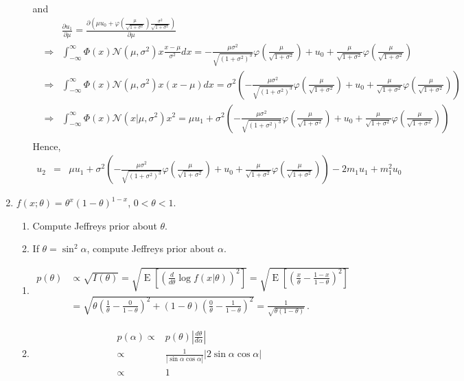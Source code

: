 \documentclass[10pt,a4paper]{article}
\def\MN{{\mathcal N}}
\begin{document}
\begin{enumerate}
\begin{enumerate}
\begin{eqnarray*}
\end{eqnarray*}
and 
\begin{eqnarray*}
&& \frac{\partial u_1}{\partial \mu} = \frac{\partial(\mu u_0+ \varphi(\frac{\mu}{\sqrt{1+\sigma^2}})\frac{\sigma^2}{\sqrt{1+\sigma^2}})}{\partial \mu} \\
&\Longrightarrow &\int_{-\infty}^{\infty}\Phi(x)\MN(\mu,\sigma^2)x\frac{x-\mu}{\sigma^2}dx = -\frac{\mu\sigma^2}{\sqrt{(1+\sigma^2)^{3}}}\varphi(\frac{\mu}{\sqrt{1+\sigma^2}})+u_0+\frac{\mu}{\sqrt{1+\sigma^2}}\varphi(\frac{\mu}{\sqrt{1+\sigma^2}}) \\
&\Longrightarrow &\int_{-\infty}^{\infty}\Phi(x)\MN(\mu,\sigma^2)x(x-\mu)dx = \sigma^2\left(-\frac{\mu\sigma^2}{\sqrt{(1+\sigma^2)^{3}}}\varphi(\frac{\mu}{\sqrt{1+\sigma^2}})+u_0+\frac{\mu}{\sqrt{1+\sigma^2}}\varphi(\frac{\mu}{\sqrt{1+\sigma^2}})\right) \\
&\Longrightarrow &\int_{-\infty}^{\infty} \Phi(x) \MN(x|\mu, \sigma^2)x^2 = \mu u_1+ \sigma^2\left(-\frac{\mu\sigma^2}{\sqrt{(1+\sigma^2)^{3}}}\varphi(\frac{\mu}{\sqrt{1+\sigma^2}})+u_0+\frac{\mu}{\sqrt{1+\sigma^2}}\varphi(\frac{\mu}{\sqrt{1+\sigma^2}})\right) \\
\end{eqnarray*}
Hence,
\begin{eqnarray*}
u_2 &=& \mu u_1+ \sigma^2\left(-\frac{\mu\sigma^2}{\sqrt{(1+\sigma^2)^{3}}}\varphi(\frac{\mu}{\sqrt{1+\sigma^2}})+u_0+\frac{\mu}{\sqrt{1+\sigma^2}}\varphi(\frac{\mu}{\sqrt{1+\sigma^2}})\right)-2m_1u_1+m_1^2u_0
\end{eqnarray*}
\end{enumerate}
\item $f(x; \theta) = \theta^x(1-\theta)^{1-x}$, $0 < \theta < 1$.
\begin{enumerate}
\item Compute Jeffreys prior about $\theta$.
\item If $\theta = \sin^2 \alpha$, compute Jeffreys prior about $\alpha$.
\end{enumerate}
\begin{enumerate}
\item 
\begin{align*}p(\theta) & \propto \sqrt{I(\theta)} = \sqrt{\operatorname{E}\!\left[ \left( \frac{d}{d\theta} \log f(x|\theta) \right)^2\right]} = \sqrt{\operatorname{E}\!\left[ \left( \frac{x}{\theta} - \frac{1-x}{1-\theta}\right)^2 \right]} \\ & = \sqrt{\theta \left( \frac{1}{\theta} - \frac{0}{1-\theta}\right)^2 + (1-\theta)\left( \frac{0}{\theta} - \frac{1}{1-\theta}\right)^2} = \frac{1}{\sqrt{\theta(1-\theta)}}\,.\end{align*} 
\item 
\begin{align*}
p(\alpha) \propto&  p(\theta)|\frac{d\theta}{d\alpha}| \\
\propto & \frac{1}{|\sin\alpha\cos\alpha|}|2\sin \alpha\cos \alpha| \\
\propto & 1 \\
\end{align*}
\end{enumerate}
\end{enumerate}
\end{document}
